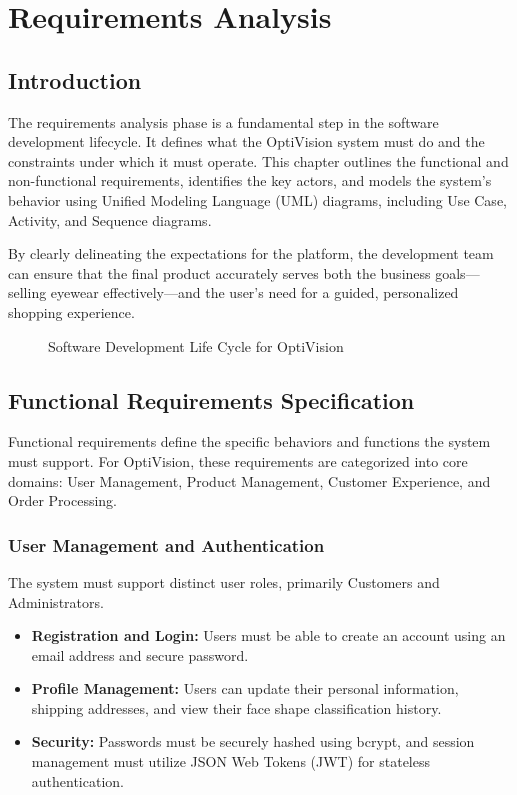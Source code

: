 \chapter{Requirements Analysis}
\label{chap:requirements}

\section{Introduction}
\label{sec:req_intro}
The requirements analysis phase is a fundamental step in the software development lifecycle. It defines what the OptiVision system must do and the constraints under which it must operate. This chapter outlines the functional and non-functional requirements, identifies the key actors, and models the system's behavior using Unified Modeling Language (UML) diagrams, including Use Case, Activity, and Sequence diagrams.

By clearly delineating the expectations for the platform, the development team can ensure that the final product accurately serves both the business goals—selling eyewear effectively—and the user's need for a guided, personalized shopping experience.

\begin{figure}[H]
    \centering
    \vspace{8cm}
    \caption{Software Development Life Cycle for OptiVision}
    \label{fig:sdlc_optivision}
\end{figure}

\section{Functional Requirements Specification}
\label{sec:req_functional}
Functional requirements define the specific behaviors and functions the system must support. For OptiVision, these requirements are categorized into core domains: User Management, Product Management, Customer Experience, and Order Processing.

\subsection{User Management and Authentication}
The system must support distinct user roles, primarily Customers and Administrators. 
\begin{itemize}
    \item \textbf{Registration and Login:} Users must be able to create an account using an email address and secure password.
    \item \textbf{Profile Management:} Users can update their personal information, shipping addresses, and view their face shape classification history.
    \item \textbf{Security:} Passwords must be securely hashed using bcrypt, and session management must utilize JSON Web Tokens (JWT) for stateless authentication.
\end{itemize}

